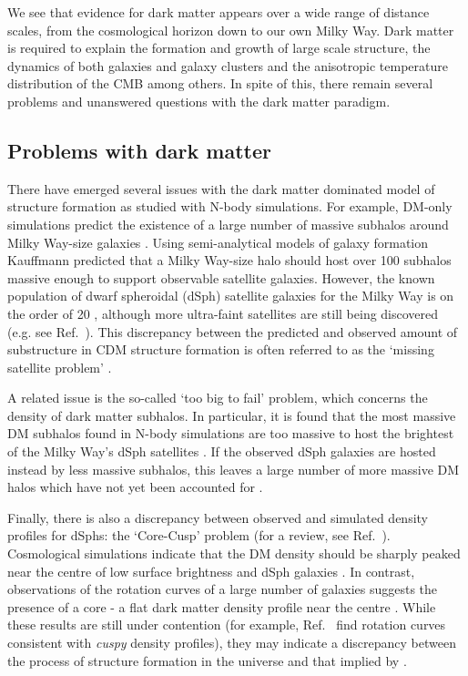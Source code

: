 We see that evidence for dark matter appears over a wide range of distance scales, from the cosmological horizon down to our own Milky Way. Dark matter is required to explain the formation and growth of large scale structure, the dynamics of both galaxies and galaxy clusters and the anisotropic temperature distribution of the CMB among others. In spite of this, there remain several problems and unanswered questions with the dark matter paradigm.


\subsection{Problems with dark matter}
\label{sec:intro:problems}
There have emerged several issues with the dark matter dominated model of structure formation as studied with N-body simulations. For example, DM-only simulations predict the existence of a large number of massive subhalos around Milky Way-size galaxies \cite{Springel:2008}. Using semi-analytical models of galaxy formation Kauffmann \etal \cite{Kauffmann:1993} predicted that a Milky Way-size halo should host over 100 subhalos massive enough to support observable satellite galaxies.  However, the known population of dwarf spheroidal (dSph) satellite galaxies for the Milky Way is on the order of 20 \cite{Walker:2009}, although more ultra-faint satellites are still being discovered (e.g. see Ref.~\cite{Belokurov:2010}). This discrepancy between the predicted and observed amount of substructure in CDM structure formation is often referred to as the `missing satellite problem' \cite{Klypin:1999}.

A related issue is the so-called `too big to fail' problem, which concerns the density of dark matter subhalos. In particular, it is found that the most massive DM subhalos found in N-body simulations are too massive to host the brightest of the Milky Way's dSph satellites \cite{Boylan-Kolchin:2011}. If the observed dSph galaxies are hosted instead by less massive subhalos, this leaves a large number of more massive DM halos which have not yet been accounted for \cite{Garrison-Kimmel:2014}.

Finally, there is also a discrepancy between observed and simulated density profiles for dSphs: the `Core-Cusp' problem (for a review, see Ref.~\cite{deBlok:2009}). Cosmological simulations indicate that the DM density should be sharply peaked near the centre of low surface brightness and dSph galaxies \cite{Dubinski:1991, Navarro:1996}. In contrast, observations of the rotation curves of a large number of galaxies suggests the presence of a core - a flat dark matter density profile near the centre \cite{Salucci:2001, Donato:2004}. While these results are still under contention (for example, Ref.~\cite{Hayashi:2004} find rotation curves consistent with \textit{cuspy} density profiles), they may indicate a discrepancy between the process of structure formation in the universe and that implied by \LCDM.

